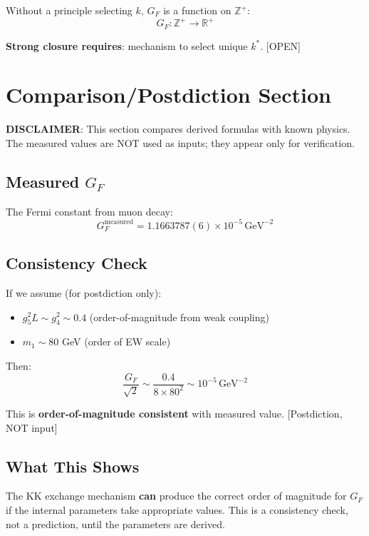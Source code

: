 \documentclass[11pt,a4paper]{article}
\begin{document}
Without a principle selecting $k$, $G_F$ is a function on $\mathbb{Z}^+$:
\begin{equation}
G_F: \mathbb{Z}^+ \to \mathbb{R}^+
\label{eq:gf-function}
\end{equation}

\textbf{Strong closure requires}: mechanism to select unique $k^*$. [OPEN]

\section{Comparison/Postdiction Section}
\label{app:postdiction}

\textbf{DISCLAIMER}: This section compares derived formulas with known physics.
The measured values are NOT used as inputs; they appear only for verification.

\subsection{Measured $G_F$}

The Fermi constant from muon decay:
\begin{equation}
G_F^{\text{measured}} = 1.1663787(6) \times 10^{-5} \, \text{GeV}^{-2}
\label{eq:gf-measured}
\end{equation}

\subsection{Consistency Check}

If we assume (for postdiction only):
\begin{itemize}
\item $g_5^2 L \sim g_4^2 \sim 0.4$ (order-of-magnitude from weak coupling)
\item $m_1 \sim 80$ GeV (order of EW scale)
\end{itemize}

Then:
\begin{equation}
\frac{G_F}{\sqrt{2}} \sim \frac{0.4}{8 \times 80^2} \sim 10^{-5} \, \text{GeV}^{-2}
\label{eq:postdiction}
\end{equation}

This is \textbf{order-of-magnitude consistent} with measured value. [Postdiction, NOT input]

\subsection{What This Shows}

The KK exchange mechanism \textbf{can} produce the correct order of magnitude for $G_F$
if the internal parameters take appropriate values. This is a consistency check,
not a prediction, until the parameters are derived.
\end{document}
